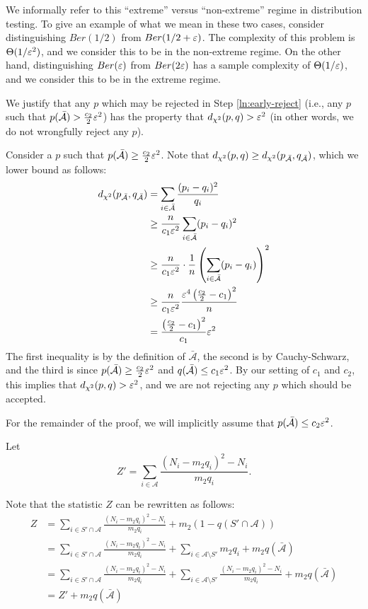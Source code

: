 \begin{remark}
We informally refer to this ``extreme'' versus ``non-extreme'' regime in distribution testing.
To give an example of what we mean in these two cases, consider distinguishing $Ber(1/2)$ from $Ber(1/2 + \varepsilon)$.
The complexity of this problem is $\Theta(1/\varepsilon^2)$, and we consider this to be in the non-extreme regime.
On the other hand, distinguishing $Ber(\varepsilon)$ from $Ber(2\varepsilon)$ has a sample complexity of $\Theta(1/\varepsilon)$, and we consider this to be in the extreme regime.
\end{remark}

We justify that any $p$ which may be rejected in Step \ref{ln:early-reject} (i.e., any $p$ such that $p(\mathcal{\bar A}) > \frac{c_2}{2} \varepsilon^2$) has the property that $d_{\chi^2}(p,q) > \varepsilon^2$ (in other words, we do not wrongfully reject any $p$).

Consider a $p$ such that $p(\mathcal{\bar A}) \geq \frac{c_2}{2}\varepsilon^2$.
Note that $d_{\chi^2}(p, q) \geq d_{\chi^2}(p_\mathcal{\bar A}, q_\mathcal{\bar A})$, which we lower bound as follows:
\begin{align*}
d_{\chi^2}(p_\mathcal{\bar A}, q_\mathcal{\bar A})
&= \sum_{i \in \mathcal{\bar A}} \frac{(p_i - q_i)^2}{q_i} \\
&\geq \frac{n}{c_1 \varepsilon^2} \sum_{i \in \mathcal{\bar A}} (p_i - q_i)^2 \\
&\geq \frac{n}{c_1 \varepsilon^2} \cdot \frac{1}{n} \left(\sum_{i \in \mathcal{\bar A}} (p_i - q_i) \right)^2  \\
&\geq \frac{n}{c_1 \varepsilon^2} \frac{\varepsilon^4\left(\frac{c_2}{2} - c_1\right)^2}{n} \\
&= \frac{\left(\frac{c_2}{2} - c_1\right)^2}{c_1}\varepsilon^2
\end{align*}
The first inequality is by the definition of $\mathcal{\bar A}$, the second is by Cauchy-Schwarz, and the third is since $p(\mathcal{\bar A}) \geq \frac{c_2}{2}\varepsilon^2$ and $q(\mathcal{\bar A}) \leq c_1\varepsilon^2$.
By our setting of $c_1$ and $c_2$, this implies that $d_{\chi^2}(p, q) > \varepsilon^2$, and we are not rejecting any $p$ which should be accepted.

For the remainder of the proof, we will implicitly assume that $p(\mathcal{\bar A}) \leq c_2 \varepsilon^2$.


Let
$$Z' = \sum_{i \in \mathcal{A}} \frac{(N_i - m_2 q_i)^2 - N_i}{m_2q_i}.$$

Note that the statistic $Z$ can be rewritten as follows:
\begin{align*}
Z &= \sum_{i \in S' \cap \mathcal{A}} \frac{(N_i - m_2q_i)^2 - N_i}{m_2q_i} + m_2 (1 - q(S' \cap \mathcal{A})) \\
  &= \sum_{i \in S' \cap \mathcal{A}} \frac{(N_i - m_2q_i)^2 - N_i}{m_2q_i} + \sum_{i \in \mathcal{A} \setminus S'} m_2 q_i + m_2  q(\mathcal{\bar A}) \\
  &= \sum_{i \in S' \cap \mathcal{A}} \frac{(N_i - m_2q_i)^2 - N_i}{m_2q_i} + \sum_{i \in \mathcal{A} \setminus S'} \frac{(N_i - m_2q_i)^2 - N_i}{m_2q_i} + m_2  q(\mathcal{\bar A}) \\
  &= Z' + m_2 q(\mathcal{\bar A})
\end{align*}

